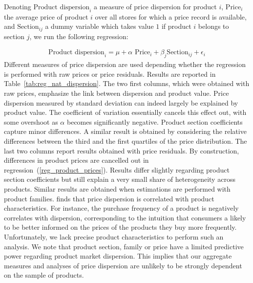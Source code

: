 \documentclass[english]{article}
\begin{document}
Denoting $\text{Product dispersion}_i$ a measure of price dispersion for product $i$, $\text{Price}_i$ the average price of product $i$ over all stores for which a price record is available, and $\text{Section}_{ij}$ a dummy variable which takes value $1$ if product $i$ belongs to section $j$, we run the following regression:

\begin{align}
\text{Product dispersion}_i = \mu + \alpha \text{ Price}_i + \beta_j \text{Section}_{ij} + \epsilon_i
\label{reg_store_dispersion}
\end{align}
Different measures of price dispersion are used depending whether the regression is performed with raw prices or price residuals. Results are reported in Table~\ref{tab:reg_nat_dispersion}. The two first columns, which were obtained with raw prices, emphasize the link between dispersion and product value. Price dispersion measured by standard deviation can indeed largely be explained by product value. The coefficient of variation essentially cancels this effect out, with some overshoot as $\alpha$ becomes significantly negative. Product section coefficients capture minor differences. A similar result is obtained by considering the relative differences between the third and the first quartiles of the price distribution. The last two columns report results obtained with price residuals. By construction, differences in product prices are cancelled out in regression~(\ref{reg_product_prices}). Results differ slightly regarding product section coefficients but still explain a very small share of heterogeneity across products. Similar results are obtained when estimations are performed with product families. \cite{ZHA06} finds that price dispersion is correlated with product characteristics. For instance, the purchase frequency of a product is negatively correlates with dispersion, corresponding to the intuition that consumers a likely to be better informed on the prices of the products they buy more frequently. Unfortunately, we lack precise product characteristics to perform such an analysis. We note that product section, family or price have a limited predictive power regarding product market dispersion. This implies that our aggregate measures and analyses of price dispersion are unlikely to be strongly dependent on the sample of products.
\end{document}
